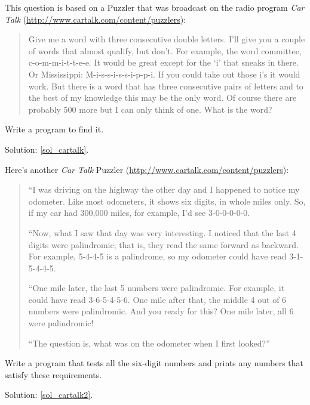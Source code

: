 \begin{exercise}
\label{cartalk}

This question is based on a Puzzler that was broadcast on the radio
program {\em Car Talk} 
(\url{http://www.cartalk.com/content/puzzlers}):

\begin{quote}
Give me a word with three consecutive double letters. I'll give you a
couple of words that almost qualify, but don't. For example, the word
committee, c-o-m-m-i-t-t-e-e. It would be great except for the `i' that
sneaks in there. Or Mississippi: M-i-s-s-i-s-s-i-p-p-i. If you could
take out those i's it would work. But there is a word that has three
consecutive pairs of letters and to the best of my knowledge this may
be the only word. Of course there are probably 500 more but I can only
think of one. What is the word?
\end{quote}

Write a program to find it.

Solution: \ref{sol_cartalk}.

\end{exercise}


\begin{exercise}
Here's another {\em Car Talk}
Puzzler (\url{http://www.cartalk.com/content/puzzlers}):
\label{cartalk2}

\begin{quote}
``I was driving on the highway the other day and I happened to
notice my odometer. Like most odometers, it shows six digits,
in whole miles only. So, if my car had 300,000
miles, for example, I'd see 3-0-0-0-0-0.

``Now, what I saw that day was very interesting. I noticed that the
last 4 digits were palindromic; that is, they read the same forward as
backward. For example, 5-4-4-5 is a palindrome, so my odometer
could have read 3-1-5-4-4-5.

``One mile later, the last 5 numbers were palindromic. For example, it
could have read 3-6-5-4-5-6.  One mile after that, the middle 4 out of
6 numbers were palindromic.  And you ready for this? One mile later,
all 6 were palindromic!

``The question is, what was on the odometer when I first looked?''
\end{quote}

Write a program that tests all the six-digit numbers and prints
any numbers that satisfy these requirements.
  
Solution: \ref{sol_cartalk2}.

\end{exercise}


